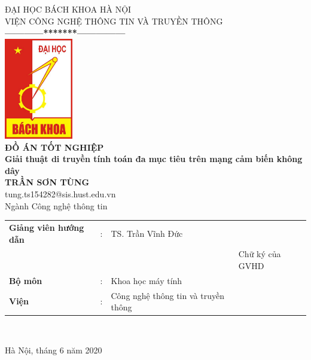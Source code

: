 \documentclass{hust}
\begin{document}
	\newtheorem{definition}{Định nghĩa}[section]
	
	\thispagestyle{empty}
	
	\thisfancypage{
		\setlength{\fboxrule}{1pt}
		\doublebox}{}
	\begin{center}
		
		{
			{
				\fontsize{12}{12}\selectfont ĐẠI HỌC BÁCH KHOA HÀ NỘI\\VIỆN CÔNG NGHỆ THÔNG TIN VÀ TRUYỀN THÔNG}\\
			\textbf{------------*******---------------}\\[1cm]
			\includegraphics[width=3cm]{logo}
			\centering
			\\[1cm]
			{\fontsize{25}{43}\selectfont \textbf{ĐỒ ÁN TỐT NGHIỆP}}\\[0.2cm]
			{\fontsize{20}{26}\selectfont \textbf{Giải thuật di truyền tính toán đa mục tiêu trên mạng cảm biến không dây}}\\[0.4cm]
			{\fontsize{14}{20}\selectfont \textbf{TRẦN SƠN TÙNG} \\
				\fontsize{12}{18}\selectfont tung.ts154282@sis.hust.edu.vn}\\[0.4cm]
			
			{\fontsize{17}{10}\selectfont Ngành Công nghệ thông tin}\\[1cm]
			
			
			\begin{tabular}{l c l l}
				\textbf{Giảng viên hướng dẫn} & : &  TS. Trần Vĩnh Đức & \text{\_\_\_\_\_\_\_\_\_\_\_\_\_} \\
				& & & \fontsize{10}{12}\selectfont Chữ ký của GVHD\\
				\textbf{Bộ môn} & : &  Khoa học máy tính \\
				\textbf{Viện} & : &  Công nghệ thông tin và truyền thông \\
			\end{tabular} \\[1.6cm]
		}
		
		\fontsize{17}{19}\selectfont Hà Nội, tháng 6 năm 2020
	\end{center}
\pagebreak
\end{document}
